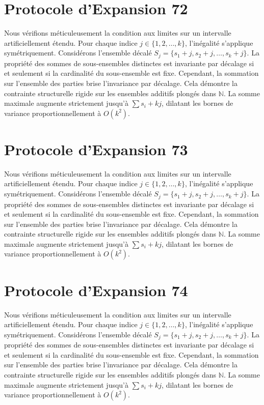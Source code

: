 \documentclass[12pt, a4paper, french]{article}
\theoremstyle{definition}
\begin{document}
\section{Protocole d'Expansion 72}
Nous vérifions méticuleusement la condition aux limites sur un intervalle artificiellement étendu. Pour chaque indice $j \in \{1, 2, \dots, k\}$, l'inégalité s'applique symétriquement. Considérons l'ensemble décalé $S_j = \{s_1 + j, s_2 + j, \dots, s_k + j\}$. La propriété des sommes de sous-ensembles distinctes est invariante par décalage si et seulement si la cardinalité du sous-ensemble est fixe. Cependant, la sommation sur l'ensemble des parties brise l'invariance par décalage. Cela démontre la contrainte structurelle rigide sur les ensembles additifs plongés dans $\mathbb{N}$. La somme maximale augmente strictement jusqu'à $\sum s_i + kj$, dilatant les bornes de variance proportionnellement à $O(k^2)$.

\section{Protocole d'Expansion 73}
Nous vérifions méticuleusement la condition aux limites sur un intervalle artificiellement étendu. Pour chaque indice $j \in \{1, 2, \dots, k\}$, l'inégalité s'applique symétriquement. Considérons l'ensemble décalé $S_j = \{s_1 + j, s_2 + j, \dots, s_k + j\}$. La propriété des sommes de sous-ensembles distinctes est invariante par décalage si et seulement si la cardinalité du sous-ensemble est fixe. Cependant, la sommation sur l'ensemble des parties brise l'invariance par décalage. Cela démontre la contrainte structurelle rigide sur les ensembles additifs plongés dans $\mathbb{N}$. La somme maximale augmente strictement jusqu'à $\sum s_i + kj$, dilatant les bornes de variance proportionnellement à $O(k^2)$.

\section{Protocole d'Expansion 74}
Nous vérifions méticuleusement la condition aux limites sur un intervalle artificiellement étendu. Pour chaque indice $j \in \{1, 2, \dots, k\}$, l'inégalité s'applique symétriquement. Considérons l'ensemble décalé $S_j = \{s_1 + j, s_2 + j, \dots, s_k + j\}$. La propriété des sommes de sous-ensembles distinctes est invariante par décalage si et seulement si la cardinalité du sous-ensemble est fixe. Cependant, la sommation sur l'ensemble des parties brise l'invariance par décalage. Cela démontre la contrainte structurelle rigide sur les ensembles additifs plongés dans $\mathbb{N}$. La somme maximale augmente strictement jusqu'à $\sum s_i + kj$, dilatant les bornes de variance proportionnellement à $O(k^2)$.
\end{document}

